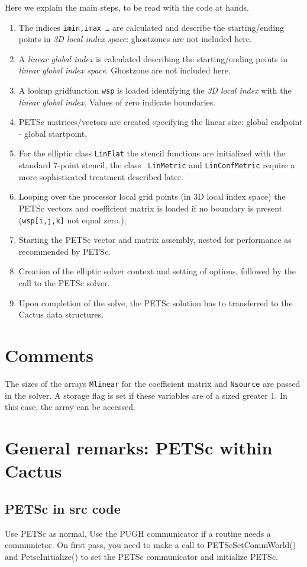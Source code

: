 \documentclass{article}
\begin{document}
Here we explain the main steps, to be read with the code at hands.
\begin{enumerate}
\item{} The indices {\tt imin,imax \ldots} are calculated and describe
the starting/ending points  in {\em 3D local index space}: ghostzones
are not included here.
\item A {\em linear global index} is calculated describing the starting/ending
points{} in {\em linear global index space}. Ghostzone are not included
here.
\item{} A lookup gridfunction {\tt wsp} is loaded identifying the {\em 3D local
index} with the {\em linear global index}. Values of zero indicate boundaries.
\item{} PETSc matrices/vectors are created specifying the linear size: global
endpoint - global startpoint.
\item{} For the elliptic class {\tt LinFlat} the stencil functions are 
initialized with the standard 7-point stencil, the class {\tt
LinMetric} and {\tt LinConfMetric} require a more sophisticated
treatment described later.
\item{} Looping over the processor local grid points (in 3D local
index space) the PETSc vectors and coefficient matrix is loaded if no
boundary is present ({\tt wsp[i,j,k]} not equal zero.);
\item{} Starting the PETSc vector and matrix assembly, nested for
performance as recommended by PETSc.
\item{} Creation of the elliptic solver context and setting of
options, followed by the call to the PETSc solver.
\item{} Upon completion of the solve, the PETSc solution has to
transferred to the Cactus data structures.
\end{enumerate} 

\section{Comments}
The sizes of the arrays {\tt Mlinear} for the coefficient matrix and
{\tt Nsource} are passed in the solver. A storage flag is set if these 
variables are of a sized greater 1. In this case, the array can be
accessed.

\section{General remarks: PETSc within Cactus}

\subsection{PETSc in src code}
Use PETSc as normal, Use the PUGH communicator if a routine needs a
communictor. 
On first pass, you need to make a call to PETScSetCommWorld()
and PetscInitialize() to set the PETSc communicator and initialize
PETSc.
\end{document}
